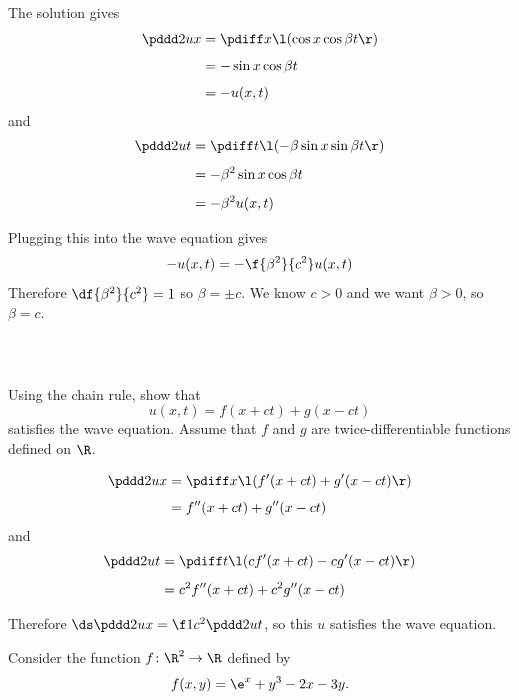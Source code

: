 \documentclass[a4paper]{article}
\begin{document}
The solution gives \begin{align*}
\pddd 2ux &= \pdiff x \l( \cos x \cos \beta t \r)\\[1ex]
&= -\sin x \cos \beta t\\[1ex]
&= -u(x, t)
\end{align*}
and \begin{align*}
\pddd 2ut &= \pdiff t \l( -\beta \sin x \sin \beta t \r)\\[1ex]
&= -\beta^2 \sin x \cos \beta t\\[1ex]
&= -\beta^2 u(x, t)
\end{align*}

Plugging this into the wave equation gives $$-u(x, t) = -\f{\beta^2}{c^2} u(x, t)$$
Therefore $\df{\beta^2}{c^2} = 1$ so $\beta = \pm c$. We know $c > 0$ and we want $\beta > 0$, so $\beta = c$.

\subsubsection{~} %

\begin{questionbody}
Using the chain rule, show that \[
u(x, t) = f(x + ct) + g(x - ct)
\] satisfies the wave equation. Assume that $f$ and $g$ are twice-differentiable functions defined on $\R$.
\end{questionbody}

\begin{align*}
\pddd 2ux &= \pdiff x \l( f'(x+ct) + g'(x-ct) \r)\\[1ex]
&= f''(x+ct) + g''(x-ct)
\end{align*}
and \begin{align*}
\pddd 2ut &= \pdiff t \l( c f'(x+ct) - c g'(x-ct) \r)\\[1ex]
&= c^2 f''(x+ct) + c^2 g''(x-ct)
\end{align*}

Therefore $\ds \pddd 2ux = \f1{c^2} \pddd 2ut$, so this $u$ satisfies the wave equation.


\begin{questionbody}
Consider the function $f \colon \R^2 \to \R$ defined by \[
f(x, y) = \e^x + y^3 - 2x - 3y.
\]
\end{questionbody}

\subsection{~} %
\end{document}
